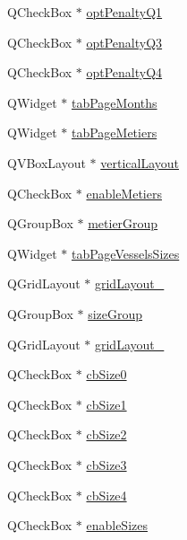 \begin{DoxyCompactItemize}
\item 
Q\+Check\+Box $\ast$ \mbox{\hyperlink{class_ui___path_penalty_dialog_a113059b218e6b38935632317cbde7ff6}{opt\+Penalty\+Q1}}
\item 
Q\+Check\+Box $\ast$ \mbox{\hyperlink{class_ui___path_penalty_dialog_ad974f1ba67414021141a6d36a5bba18d}{opt\+Penalty\+Q3}}
\item 
Q\+Check\+Box $\ast$ \mbox{\hyperlink{class_ui___path_penalty_dialog_aba8002d7366f26bcfa3872ec127e8f23}{opt\+Penalty\+Q4}}
\item 
Q\+Widget $\ast$ \mbox{\hyperlink{class_ui___path_penalty_dialog_ab41184e82e9a3d649dce4233fe5c73b1}{tab\+Page\+Months}}
\item 
Q\+Widget $\ast$ \mbox{\hyperlink{class_ui___path_penalty_dialog_ad33d67d5e959ba14b1488d77622dadfe}{tab\+Page\+Metiers}}
\item 
Q\+V\+Box\+Layout $\ast$ \mbox{\hyperlink{class_ui___path_penalty_dialog_a1aa82486547a2471f2d927f51976234a}{vertical\+Layout}}
\item 
Q\+Check\+Box $\ast$ \mbox{\hyperlink{class_ui___path_penalty_dialog_ac72f0a486c18b433bb1c8c137de285db}{enable\+Metiers}}
\item 
Q\+Group\+Box $\ast$ \mbox{\hyperlink{class_ui___path_penalty_dialog_a11982a030cfe2160eb15d15537e73fe2}{metier\+Group}}
\item 
Q\+Widget $\ast$ \mbox{\hyperlink{class_ui___path_penalty_dialog_a3779f00fefac154a691d5739d166d7cd}{tab\+Page\+Vessels\+Sizes}}
\item 
Q\+Grid\+Layout $\ast$ \mbox{\hyperlink{class_ui___path_penalty_dialog_aafab5b01fb20f32023f2bf094140c57f}{grid\+Layout\+\_}}
\item 
Q\+Group\+Box $\ast$ \mbox{\hyperlink{class_ui___path_penalty_dialog_ae0514c7931c4e0e7b6584b18888f235b}{size\+Group}}
\item 
Q\+Grid\+Layout $\ast$ \mbox{\hyperlink{class_ui___path_penalty_dialog_a497685be8e493a8f6161eb220154ad1d}{grid\+Layout\+\_}}
\item 
Q\+Check\+Box $\ast$ \mbox{\hyperlink{class_ui___path_penalty_dialog_a7950642eea57c773f4d50de496fbdcfa}{cb\+Size0}}
\item 
Q\+Check\+Box $\ast$ \mbox{\hyperlink{class_ui___path_penalty_dialog_a50268193c96886ab8112da511260a5fa}{cb\+Size1}}
\item 
Q\+Check\+Box $\ast$ \mbox{\hyperlink{class_ui___path_penalty_dialog_ae2b6a5fdb6feed203da0f05917f36257}{cb\+Size2}}
\item 
Q\+Check\+Box $\ast$ \mbox{\hyperlink{class_ui___path_penalty_dialog_ab6ea2cb1023dd8351da8dd28a10821d4}{cb\+Size3}}
\item 
Q\+Check\+Box $\ast$ \mbox{\hyperlink{class_ui___path_penalty_dialog_ad6cdcb82b85b2bfd0006c01d4e46b16c}{cb\+Size4}}
\item 
Q\+Check\+Box $\ast$ \mbox{\hyperlink{class_ui___path_penalty_dialog_a7a1c085bbe509ee881d796ce96b394a4}{enable\+Sizes}}
\end{DoxyCompactItemize}


